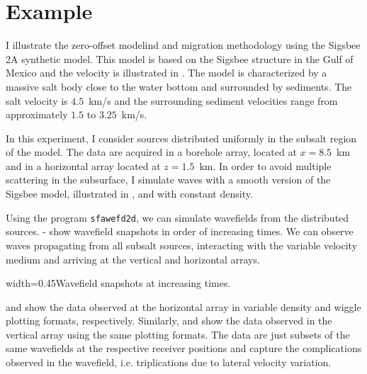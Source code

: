 
\section{Example}
I illustrate the zero-offset modelind and migration methodology using
the Sigsbee 2A synthetic model. This model is based on the Sigsbee
structure in the Gulf of Mexico and the velocity is illustrated in
. The model is characterized by a massive salt body close to
the water bottom and surrounded by sediments. The salt velocity is
$4.5$~km/s and the surrounding sediment velocities range from
approximately $1.5$ to $3.25$~km/s.


In this experiment, I consider sources distributed uniformly in the
subsalt region of the model. The data are acquired in a borehole
array, located at $x=8.5$~km and in a horizontal array located at
$z=1.5$~km. In order to avoid multiple scattering in the subsurface, I
simulate waves with a smooth version of the Sigsbee model, illustrated
in , and with constant density.


Using the \mg program \texttt{sfawefd2d}, we can simulate wavefields
from the distributed sources. - show
wavefield snapshots in order of increasing times. We can observe waves
propagating from all subsalt sources, interacting with the variable
velocity medium and arriving at the vertical and horizontal arrays.

{width=0.45\textwidth}{Wavefield snapshots at increasing times.}

 and  show the data observed at the horizontal
array in variable density and wiggle plotting formats,
respectively. Similarly,  and  show the data
observed in the vertical array using the same plotting formats. The
data are just subsets of the same wavefields at the respective
receiver positions and capture the complications observed in the
wavefield, i.e. triplications due to lateral velocity variation.

